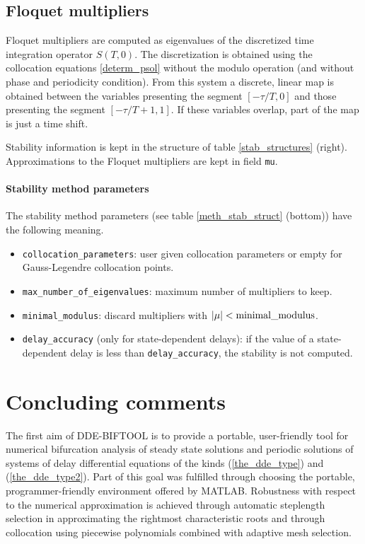 \documentclass[10pt]{scrartcl}
\newcommand{\DDEBIFCODE}{\textsc{DDE-BIFTOOL}}
\newcommand{\blist}[1]{\mbox{\lstinline!#1!}}
\begin{document}
{\subsection{Floquet multipliers}
Floquet multipliers are computed as eigenvalues of the discretized
time integration operator $S(T,0)$.  The discretization is obtained
using the collocation equations \eqref{determ_psol} without the modulo
operation (and without phase and periodicity condition).  From this
system a discrete, linear map is obtained between the variables
presenting the segment $[-\tau/T,0]$ and those presenting the segment
$[-\tau/T+1,1]$.  If these variables overlap, part of the map is just
a time shift.

Stability information is kept in the structure of table
\ref{stab_structures} (right). Approximations to the Floquet
multipliers are kept in field \blist{mu}.
\paragraph{Stability method parameters}
The stability method parameters (see table \ref{meth_stab_struct}
(bottom)) have the following meaning.
\begin{itemize}
\item \blist{collocation_parameters}: user given collocation
  parameters or empty for Gauss-Legendre collocation points.
\item \blist{max_number_of_eigenvalues}: maximum number of multipliers
  to keep.
\item \blist{minimal_modulus}: discard multipliers with
$|\mu|<\blist{minimal_modulus}$.
\item \blist{delay_accuracy} (only for state-dependent delays): if the
  value of a state-dependent delay is less than
  \blist{delay_accuracy}, the stability is not computed.
\end{itemize}

\section{Concluding comments}\label{limits_sec}

The first aim of {\DDEBIFCODE} is to provide a portable,
user-friendly 
tool for numerical bifurcation analysis 
of steady state solutions and periodic solutions of systems
of delay differential equations of the kinds (\ref{the_dde_type})
and (\ref{the_dde_type2}).
Part of this goal was fulfilled through choosing
the portable, programmer-friendly environment
offered by MATLAB.
Robustness with respect to the numerical approximation
is achieved through automatic steplength
selection in approximating the rightmost characteristic roots
and through collocation using piecewise polynomials combined
with adaptive mesh selection.

}
\end{document}
